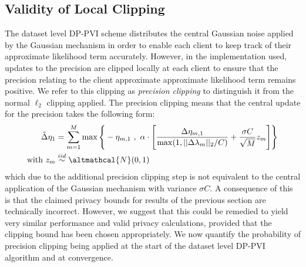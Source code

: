 \subsection{Validity of Local Clipping}
The dataset level DP-PVI scheme distributes the central Gaussian noise applied by the Gaussian mechanism in order to enable each client to keep track of their approximate likelihood term accurately. However, in the implementation used, updates to the precision are clipped locally at each client to ensure that the precision relating to the client approximate approximate likelihood term remains positive. We refer to this clipping as \emph{precision clipping} to distinguish it from the normal $\ell_2$ clipping applied. The precision clipping means that the central update for the precision takes the following form:
\begin{align}
\tilde{\Delta} \eta_1 &= \sum_{m=1}^{M} \max \Bigg \lbrace -\eta_{m, 1}\ ,\ \alpha \cdot \Bigg[ \frac{\Delta \eta_{m, 1}}{\max(1, || \Delta \lambda_m||_2 / C)} + \frac{\sigma C}{\sqrt{M}} z_m \Bigg]   \Bigg \rbrace  \nonumber \\\text{with }z_m &\stackrel{iid}{\sim} \altmathcal{N}(0, 1)
\end{align}
which due to the additional precision clipping step is not equivalent to the central application of the Gaussian mechanism with variance $\sigma C$. A consequence of this is that the claimed privacy bounds for results of the previous section are technically incorrect. However, we suggest that this could be remedied to yield very similar performance and valid privacy calculations, provided that the clipping bound has been chosen appropriately. We now quantify the probability of precision clipping being applied at the start of the dataset level DP-PVI algorithm and at convergence.

